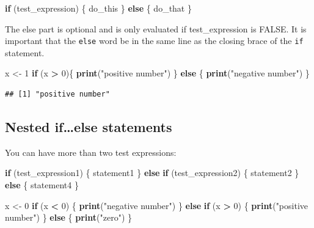 \documentclass[]{book}
\newenvironment{Shaded}{\begin{snugshade}}{\end{snugshade}}
\newcommand{\ControlFlowTok}[1]{\textcolor[rgb]{0.13,0.29,0.53}{\textbf{#1}}}
\newcommand{\DecValTok}[1]{\textcolor[rgb]{0.00,0.00,0.81}{#1}}
\newcommand{\KeywordTok}[1]{\textcolor[rgb]{0.13,0.29,0.53}{\textbf{#1}}}
\newcommand{\NormalTok}[1]{#1}
\newcommand{\OperatorTok}[1]{\textcolor[rgb]{0.81,0.36,0.00}{\textbf{#1}}}
\newcommand{\StringTok}[1]{\textcolor[rgb]{0.31,0.60,0.02}{#1}}
\begin{document}
\begin{Shaded}
\begin{Highlighting}[]
\ControlFlowTok{if}\NormalTok{ (test_expression) \{}
\NormalTok{  do_this}
\NormalTok{\} }\ControlFlowTok{else}\NormalTok{ \{}
\NormalTok{    do_that}
\NormalTok{\}}
\end{Highlighting}
\end{Shaded}

The else part is optional and is only evaluated if test\_expression is FALSE. It is important that the \texttt{else} word be in the same line as the closing brace of the \texttt{if} statement.

\begin{Shaded}
\begin{Highlighting}[]
\NormalTok{x <-}\StringTok{ }\DecValTok{1}
\ControlFlowTok{if}\NormalTok{ (x }\OperatorTok{>}\StringTok{ }\DecValTok{0}\NormalTok{)\{}
  \KeywordTok{print}\NormalTok{(}\StringTok{"positive number"}\NormalTok{)}
\NormalTok{\} }\ControlFlowTok{else}\NormalTok{ \{}
    \KeywordTok{print}\NormalTok{(}\StringTok{"negative number"}\NormalTok{)}
\NormalTok{\}}
\end{Highlighting}
\end{Shaded}

\begin{verbatim}
## [1] "positive number"
\end{verbatim}

\hypertarget{nested-ifelse-statements}{%
\subsection*{Nested if\ldots{}else statements}\label{nested-ifelse-statements}}

You can have more than two test expressions:

\begin{Shaded}
\begin{Highlighting}[]
\ControlFlowTok{if}\NormalTok{ (test_expression1) \{ }
\NormalTok{  statement1}
\NormalTok{\} }\ControlFlowTok{else} \ControlFlowTok{if}\NormalTok{ (test_expression2) \{}
\NormalTok{    statement2}
\NormalTok{\} }\ControlFlowTok{else}\NormalTok{ \{}
\NormalTok{      statement4}
\NormalTok{\}}
\end{Highlighting}
\end{Shaded}

\begin{Shaded}
\begin{Highlighting}[]
\NormalTok{x <-}\StringTok{ }\DecValTok{0}
\ControlFlowTok{if}\NormalTok{ (x }\OperatorTok{<}\StringTok{ }\DecValTok{0}\NormalTok{) \{}
   \KeywordTok{print}\NormalTok{(}\StringTok{"negative number"}\NormalTok{)}
\NormalTok{\} }\ControlFlowTok{else} \ControlFlowTok{if}\NormalTok{ (x }\OperatorTok{>}\StringTok{ }\DecValTok{0}\NormalTok{) \{}
   \KeywordTok{print}\NormalTok{(}\StringTok{"positive number"}\NormalTok{)}
\NormalTok{\} }\ControlFlowTok{else}\NormalTok{ \{}
   \KeywordTok{print}\NormalTok{(}\StringTok{"zero"}\NormalTok{)}
\NormalTok{\}  }
\end{Highlighting}
\end{Shaded}
\end{document}
